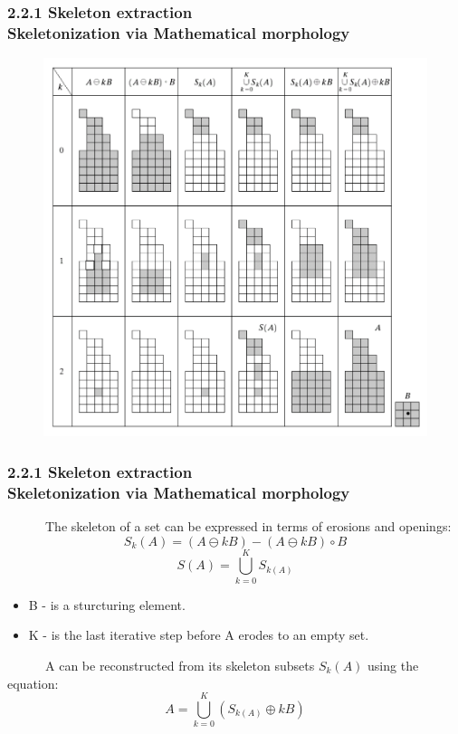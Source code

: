 \documentclass[notheorems,serif,table,compress]{beamer}  %
\begin{document}
\begin{frame}
\frametitle{2.2.1 Skeleton extraction \\ \normalsize{Skeletonization via Mathematical morphology}}
            \begin{figure}
              \centering
              \includegraphics[width=0.7\linewidth]{xingtai} 
            \end{figure}
\end{frame}

\begin{frame}
\frametitle{2.2.1 Skeleton extraction \\ \normalsize{Skeletonization via Mathematical morphology}}
~~~~~~The skeleton of a set can be expressed in terms of erosions and openings:
           \begin{displaymath}
             S_{k}(A)=(A\ominus kB)-(A \ominus kB)\circ B
           \end{displaymath} 
            \begin{displaymath}
             S(A)=\bigcup_{k=0}^{K}S_{k(A)}
           \end{displaymath}
\begin{itemize}
\item B - is a sturcturing element.
\item K - is the last iterative step before A erodes to an empty set.
\end{itemize}
~~~~~~A can be reconstructed from its skeleton subsets $S_{k}(A)$ using the equation:
            \begin{displaymath}
             A=\bigcup_{k=0}^{K}(S_{k(A)}\oplus kB)
           \end{displaymath}
\end{frame}
\end{document}
